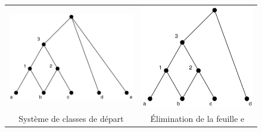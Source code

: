 \documentclass[a4paper]{report}
\begin{document}
\begin{figure}
\begin{center}
\begin{tabular}{cc}
\includegraphics[scale=.5]{images/classes1}&\includegraphics[scale=.5]{images/classes2}\\
Système de classes de départ &\'Elimination de la feuille e\\

\end{tabular}
\end{center}
\end{figure}
\end{document}
